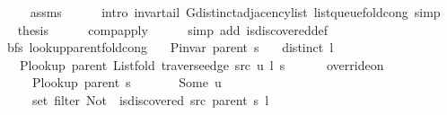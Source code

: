 \begin{isabellebody}
\ \ \ \ \isamarkupfalse%
\ assms\isanewline
\ \ \ \ \isamarkupfalse%
\ {\isacharparenleft}{\kern0pt}intro\ invar{\isacharunderscore}{\kern0pt}tail\ G{\isachardot}{\kern0pt}distinct{\isacharunderscore}{\kern0pt}adjacency{\isacharunderscore}{\kern0pt}list\ list{\isacharunderscore}{\kern0pt}queue{\isacharunderscore}{\kern0pt}fold{\isacharunderscore}{\kern0pt}cong{\isacharparenright}{\kern0pt}\ simp{\isacharplus}{\kern0pt}\isanewline
\ \ \isamarkupfalse%
\ {\isacharquery}{\kern0pt}thesis\isanewline
\ \ \ \ \isamarkupfalse%
\ comp{\isacharunderscore}{\kern0pt}apply\isanewline
\ \ \ \ \isamarkupfalse%
\ {\isacharparenleft}{\kern0pt}simp\ add{\isacharcolon}{\kern0pt}\ is{\isacharunderscore}{\kern0pt}discovered{\isacharunderscore}{\kern0pt}def{\isacharparenright}{\kern0pt}\isanewline
{}\isamarkupfalse%
%
\endisatagproof
{\isafoldproof}%
%
\isadelimproof
\isanewline
%
\endisadelimproof
\isanewline
{}\isamarkupfalse%
\ {\isacharparenleft}{\kern0pt}\ bfs{\isacharparenright}{\kern0pt}\ lookup{\isacharunderscore}{\kern0pt}parent{\isacharunderscore}{\kern0pt}fold{\isacharunderscore}{\kern0pt}cong{\isacharcolon}{\kern0pt}\isanewline
\ \ \ {\isachardoublequoteopen}P{\isacharunderscore}{\kern0pt}invar\ {\isacharparenleft}{\kern0pt}parent\ s{\isacharparenright}{\kern0pt}{\isachardoublequoteclose}\isanewline
\ \ \ {\isachardoublequoteopen}distinct\ l{\isachardoublequoteclose}\isanewline
\ \ \isanewline
\ \ \ \ {\isachardoublequoteopen}P{\isacharunderscore}{\kern0pt}lookup\ {\isacharparenleft}{\kern0pt}parent\ {\isacharparenleft}{\kern0pt}List{\isachardot}{\kern0pt}fold\ {\isacharparenleft}{\kern0pt}traverse{\isacharunderscore}{\kern0pt}edge\ src\ u{\isacharparenright}{\kern0pt}\ l\ s{\isacharparenright}{\kern0pt}{\isacharparenright}{\kern0pt}\ {\isacharequal}{\kern0pt}\isanewline
\ \ \ \ \ override{\isacharunderscore}{\kern0pt}on\isanewline
\ \ \ \ \ \ {\isacharparenleft}{\kern0pt}P{\isacharunderscore}{\kern0pt}lookup\ {\isacharparenleft}{\kern0pt}parent\ s{\isacharparenright}{\kern0pt}{\isacharparenright}{\kern0pt}\isanewline
\ \ \ \ \ \ {\isacharparenleft}{\kern0pt}{\isasymlambda}{\isacharunderscore}{\kern0pt}{\isachardot}{\kern0pt}\ Some\ u{\isacharparenright}{\kern0pt}\isanewline
\ \ \ \ \ \ {\isacharparenleft}{\kern0pt}set\ {\isacharparenleft}{\kern0pt}filter\ {\isacharparenleft}{\kern0pt}Not\ {\isasymcirc}\ is{\isacharunderscore}{\kern0pt}discovered\ src\ {\isacharparenleft}{\kern0pt}parent\ s{\isacharparenright}{\kern0pt}{\isacharparenright}{\kern0pt}\ l{\isacharparenright}{\kern0pt}{\isacharparenright}{\kern0pt}{\isachardoublequoteclose}\isanewline

\end{isabellebody}
